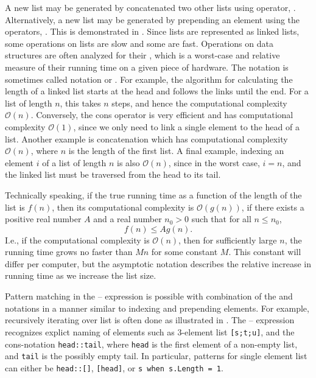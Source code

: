\documentclass[fsharpNotes.tex]{subfiles}
\begin{document}
A new list may be generated by concatenated two other lists using  operator, . Alternatively, a new list may be generated by prepending an element using the  operators,  \idx[::@\lstinline{::}]{\lexeme{::}}. This is demonstrated in .
%
%
Since lists are represented as linked lists, some operations on lists are slow and some are fast. Operations on data structures are often analyzed for their , which is a worst-case and relative measure of their running time on a given piece of hardware. The notation is sometimes called  notation or . For example, the algorithm for calculating the length of a linked list starts at the head and follows the links until the end. For a list of length $n$, this takes $n$ steps, and hence the computational complexity $\mathcal{O}(n)$. Conversely, the cons operator is very efficient and has computational complexity $\mathcal{O}(1)$, since we only need to link a single element to the head of a list. Another example is concatenation which has computational complexity $\mathcal{O}(n)$, where $n$ is the length of the first list. A final example, indexing an element $i$ of a list of length $n$ is also $\mathcal{O}(n)$, since in the worst case, $i=n$, and the linked list must be traversed from the head to its tail.

Technically speaking, if the true running time as a function of the length of the list is $f(n)$, then its computational complexity is $\mathcal{O}(g(n))$, if there exists a positive real number $A$ and a real number $n_0>0$ such that for all $n\leq n_0$,
\begin{equation}
  f(n) \leq Ag(n).
\end{equation}
I.e., if the computational complexity is $\mathcal{O}(n)$, then for sufficiently large $n$, the running time grows no faster than $Mn$ for some constant $M$. This constant will differ per computer, but the asymptotic notation describes the relative increase in running time as we increase the list size.

Pattern matching in the -- expression is possible with combination of the \lexeme{[]} and \lexeme{::} notations in a manner similar to indexing and prepending elements. For example, recursively iterating over list is often done as illustrated in .
%
%
The -- expression recognizes explict naming of elements such as 3-element list \lstinline{[s;t;u]}, and the cons-notation \lstinline{head::tail}, where \lstinline{head} is the first element of a non-empty list, and \lstinline{tail} is the possibly empty tail. In particular, patterns for single element list can either be \lstinline{head::[]}, \lstinline{[head]}, or \lstinline{s when s.Length = 1}.
\end{document}
